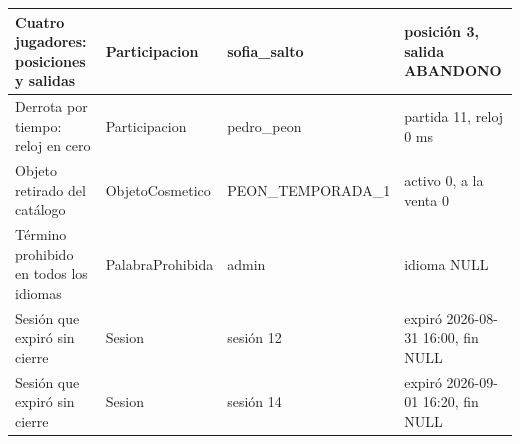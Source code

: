 \begin{center}
\begin{longtable}{|L{130.6pt}|L{86.3pt}|L{94.5pt}|L{142.0pt}|}
Cuatro jugadores: posiciones y salidas & Participacion & sofia\_\allowbreak{}salto & posición 3, salida ABANDONO \\ \hline
Derrota por tiempo: reloj en cero & Participacion & pedro\_\allowbreak{}peon & partida 11, reloj 0 ms \\ \hline
Objeto retirado del catálogo & ObjetoCosmetico & PEON\_\allowbreak{}TEMPORADA\_\allowbreak{}1 & activo 0, a la venta 0 \\ \hline
Término prohibido en todos los idiomas & PalabraProhibida & admin & idioma NULL \\ \hline
Sesión que expiró sin cierre & Sesion & sesión 12 & expiró 2026-08-31 16:00, fin NULL \\ \hline
Sesión que expiró sin cierre & Sesion & sesión 14 & expiró 2026-09-01 16:20, fin NULL \\ \hline
\end{longtable}
\end{center}
